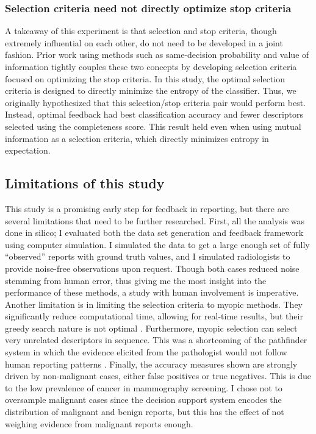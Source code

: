 \subsubsection{Selection criteria need not directly optimize stop criteria}
A takeaway of this experiment is that selection and stop criteria, though extremely influential on each other, do not need to be developed in a joint fashion. Prior work using methods such as same-decision probability \cite{Choi:2012id} and value of information \cite{Heckerman:1992uq} tightly couples these two concepts by developing selection criteria focused on optimizing the stop criteria. In this study, the optimal selection criteria is designed to directly minimize the entropy of the classifier. Thus, we originally hypothesized that this selection/stop criteria pair would perform best. Instead, optimal feedback had best classification accuracy and fewer descriptors selected using the completeness score. This result held even when using mutual information as a selection criteria, which directly minimizes entropy in expectation.


\subsection{Limitations of this study}
This study is a promising early step for feedback in reporting, but there are several limitations that need to be further researched. First, all the analysis was done in silico; I evaluated both the data set generation and feedback framework using computer simulation. I simulated the data to get a large enough set of fully ``observed'' reports with ground truth values, and I simulated radiologists to provide noise-free observations upon request. Though both cases reduced noise stemming from human error, thus giving me the most insight into the performance of these methods, a study with human involvement is imperative. Another limitation is in limiting the selection criteria to myopic methods. They significantly reduce computational time, allowing for real-time results, but their greedy search nature is not optimal \cite{Nemhauser:1978ck}. Furthermore, myopic selection can select very unrelated descriptors in sequence. This was a shortcoming of the pathfinder system in which the evidence elicited from the pathologist would not follow human reporting patterns \cite{Heckerman:1992ud}. Finally, the accuracy measures shown are strongly driven by non-malignant cases, either false positives or true negatives. This is due to the low prevalence of cancer in mammography screening. I chose not to oversample malignant cases since the decision support system encodes the distribution of malignant and benign reports, but this has the effect of not weighing evidence from malignant reports enough.


